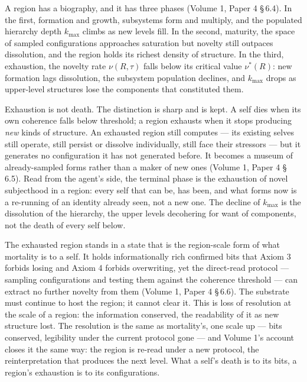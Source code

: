 \documentclass[11pt,oneside]{report}
\theoremstyle{definition}
\theoremstyle{remark}
\begin{document}
A region has a biography, and it has three phases (Volume 1, Paper 4 \S\,6.4). In the first, formation and growth, subsystems form and multiply, and the populated hierarchy depth \ensuremath{k_{\max}} climbs as new levels fill. In the second, maturity, the space of sampled configurations approaches saturation but novelty still outpaces dissolution, and the region holds its richest density of structure. In the third, exhaustion, the novelty rate \ensuremath{\nu(R,\tau)} falls below its critical value \ensuremath{\nu^*(R)}: new formation lags dissolution, the subsystem population declines, and \ensuremath{k_{\max}} drops as upper-level structures lose the components that constituted them.

Exhaustion is not death. The distinction is sharp and is kept. A self dies when its own coherence falls below threshold; a region exhausts when it stops producing \emph{new} kinds of structure. An exhausted region still computes --- its existing selves still operate, still persist or dissolve individually, still face their stressors --- but it generates no configuration it has not generated before. It becomes a museum of already-sampled forms rather than a maker of new ones (Volume 1, Paper 4 \S\,6.5). Read from the agent's side, the terminal phase is the exhaustion of novel subjecthood in a region: every self that can be, has been, and what forms now is a re-running of an identity already seen, not a new one. The decline of \ensuremath{k_{\max}} is the dissolution of the hierarchy, the upper levels decohering for want of components, not the death of every self below.

The exhausted region stands in a state that is the region-scale form of what mortality is to a self. It holds informationally rich confirmed bits that Axiom 3 forbids losing and Axiom 4 forbids overwriting, yet the direct-read protocol --- sampling configurations and testing them against the coherence threshold --- can extract no further novelty from them (Volume 1, Paper 4 \S\,6.6). The substrate must continue to host the region; it cannot clear it. This is loss of resolution at the scale of a region: the information conserved, the readability of it as new structure lost. The resolution is the same as mortality's, one scale up --- bits conserved, legibility under the current protocol gone --- and Volume 1's account closes it the same way: the region is re-read under a new protocol, the reinterpretation that produces the next level. What a self's death is to its bits, a region's exhaustion is to its configurations.
\end{document}
